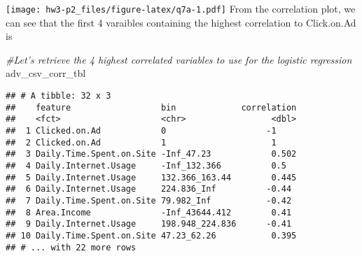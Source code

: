 \documentclass[
]{article}
\newenvironment{Shaded}{\begin{snugshade}}{\end{snugshade}}
\newcommand{\CommentTok}[1]{\textcolor[rgb]{0.56,0.35,0.01}{\textit{#1}}}
\newcommand{\DataTypeTok}[1]{\textcolor[rgb]{0.13,0.29,0.53}{#1}}
\newcommand{\DecValTok}[1]{\textcolor[rgb]{0.00,0.00,0.81}{#1}}
\newcommand{\FloatTok}[1]{\textcolor[rgb]{0.00,0.00,0.81}{#1}}
\newcommand{\KeywordTok}[1]{\textcolor[rgb]{0.13,0.29,0.53}{\textbf{#1}}}
\newcommand{\NormalTok}[1]{#1}
\newcommand{\OperatorTok}[1]{\textcolor[rgb]{0.81,0.36,0.00}{\textbf{#1}}}
\newcommand{\OtherTok}[1]{\textcolor[rgb]{0.56,0.35,0.01}{#1}}
\newcommand{\StringTok}[1]{\textcolor[rgb]{0.31,0.60,0.02}{#1}}
\begin{document}
\begin{Shaded}
\end{Shaded}

\texttt{[image: hw3-p2\_files/figure-latex/q7a-1.pdf]} From the
correlation plot, we can see that the first 4 varaibles containing the
highest correlation to Click.on.Ad is

\begin{Shaded}
\begin{Highlighting}[]
\CommentTok{#Let's retrieve the 4 highest correlated variables to use for the logistic regression}
\NormalTok{adv_csv_corr_tbl}
\end{Highlighting}
\end{Shaded}

\begin{verbatim}
## # A tibble: 32 x 3
##    feature                  bin             correlation
##    <fct>                    <chr>                 <dbl>
##  1 Clicked.on.Ad            0                    -1    
##  2 Clicked.on.Ad            1                     1    
##  3 Daily.Time.Spent.on.Site -Inf_47.23            0.502
##  4 Daily.Internet.Usage     -Inf_132.366          0.5  
##  5 Daily.Internet.Usage     132.366_163.44        0.445
##  6 Daily.Internet.Usage     224.836_Inf          -0.44 
##  7 Daily.Time.Spent.on.Site 79.982_Inf           -0.42 
##  8 Area.Income              -Inf_43644.412        0.41 
##  9 Daily.Internet.Usage     198.948_224.836      -0.41 
## 10 Daily.Time.Spent.on.Site 47.23_62.26           0.395
## # ... with 22 more rows
\end{verbatim}
\end{document}
